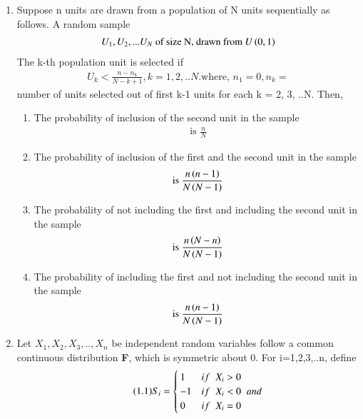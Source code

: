 \begin{enumerate}[label=\thesection.\arabic*.,ref=\thesection.\theenumi]
\item Suppose n units are drawn from a population of N units sequentially as follows. A random sample
\begin{align}
    U_1, U_2, ... U_N \text{ of size N, drawn from }U\left(0, 1\right) 
\end{align} 
The k-th population unit is selected if 
\begin{align}
    U_k<\frac{n - n_k}{N-k+1}, k = 1, 2, ..N. \text{where, } n_1=0, n_k = 
\end{align}
number of units selected out of first k-1 units for each k = 2, 3, ..N. Then,
\begin{enumerate}
    \item The probability of inclusion of the second unit in the sample
    \begin{align}
        \text{ is } \frac{n}{N}
    \end{align}
    \item The probability of inclusion of the first and the second unit in the sample
    \begin{align}
        \text{ is } \frac{n \left(n-1\right)}{N \left(N-1\right)}
    \end{align}
    \item The probability of not including the first and including the second unit in the sample
    \begin{align}
        \text{ is } \frac{n \left(N-n\right)}{N \left(N-1\right)}
    \end{align}
    \item The probability of including the first and not including the second unit in the sample
    \begin{align}
        \text{ is } \frac{n \left(n-1\right)}{N \left(N-1\right)}
    \end{align}
\end{enumerate}
%
\solution

%
%
\item Let $X_{1},X_{2},X_{3},..,X_{n}$ be independent random variables follow a common continuous distribution \textbf{F}, which is symmetric about 0. For i=1,2,3,..n, define 
\begin{align}
\tag{1.1}
\label{eq1}
S_{i} = 
\begin{cases}
1 & if \hspace{0.2cm}X_{i}>0
\\
-1 & if\hspace{0.2cm} X_{i}<0 \hspace{0.2cm} and
\\
0 & if \hspace{0.2cm}X_{i}=0

\end{cases}
\end{align}
\end{enumerate}
